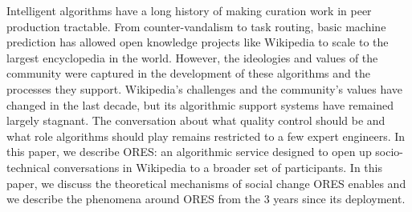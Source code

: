 Intelligent algorithms have a long history of making curation work in peer production tractable.  From counter-vandalism to task routing, basic machine prediction has allowed open knowledge projects like Wikipedia to scale to the largest encyclopedia in the world.  However, the ideologies and values of the community were captured in the development of these algorithms and the processes they support.  Wikipedia's challenges and the community's values have changed in the last decade, but its algorithmic support systems have remained largely stagnant.  The conversation about what quality control should be and what role algorithms should play remains restricted to a few expert engineers.  In this paper, we describe ORES: an algorithmic service designed to open up socio-technical conversations in Wikipedia to a broader set of participants.  In this paper, we discuss the theoretical mechanisms of social change ORES enables and we describe the phenomena around ORES from the 3 years since its deployment.

